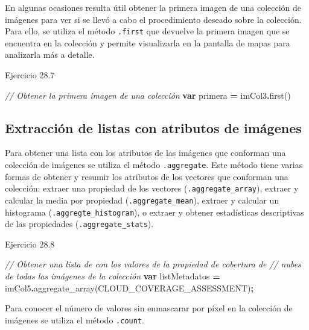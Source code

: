 \documentclass[
  12pt,
  letterpaper,
  twoside]{book}
\newenvironment{Shaded}{\begin{snugshade}}{\end{snugshade}}
\newcommand{\CommentTok}[1]{\textcolor[rgb]{0.56,0.35,0.01}{\textit{#1}}}
\newcommand{\FunctionTok}[1]{\textcolor[rgb]{0.00,0.00,0.00}{#1}}
\newcommand{\KeywordTok}[1]{\textcolor[rgb]{0.13,0.29,0.53}{\textbf{#1}}}
\newcommand{\NormalTok}[1]{#1}
\newcommand{\OperatorTok}[1]{\textcolor[rgb]{0.81,0.36,0.00}{\textbf{#1}}}
\newcommand{\StringTok}[1]{\textcolor[rgb]{0.31,0.60,0.02}{#1}}
\begin{document}
En algunas ocasiones resulta útil obtener la primera imagen de una colección de imágenes para ver si se llevó a cabo el procedimiento deseado sobre la colección. Para ello, se utiliza el método \texttt{.first} que devuelve la primera imagen que se encuentra en la colección y permite visualizarla en la pantalla de mapas para analizarla más a detalle.

Ejercicio 28.7

\begin{Shaded}
\begin{Highlighting}[]
\CommentTok{// Obtener la primera imagen de una colección}
\KeywordTok{var}\NormalTok{ primera }\OperatorTok{=}\NormalTok{ imCol3}\OperatorTok{.}\FunctionTok{first}\NormalTok{()}
\end{Highlighting}
\end{Shaded}

\hypertarget{extracciuxf3n-de-listas-con-atributos-de-imuxe1genes}{%
\subsection{Extracción de listas con atributos de imágenes}\label{extracciuxf3n-de-listas-con-atributos-de-imuxe1genes}}

Para obtener una lista con los atributos de las imágenes que conforman una colección de imágenes se utiliza el método \texttt{.aggregate}. Este método tiene varias formas de obtener y resumir los atributos de los vectores que conforman una colección: extraer una propiedad de los vectores (\texttt{.aggregate\_array}), extraer y calcular la media por propiedad (\texttt{.aggregate\_mean}), extraer y calcular un histograma (\texttt{.aggregte\_histogram}), o extraer y obtener estadísticas descriptivas de las propiedades (\texttt{.aggregate\_stats}).

Ejercicio 28.8

\begin{Shaded}
\begin{Highlighting}[]
\CommentTok{// Obtener una lista de con los valores de la propiedad de cobertura de }
\CommentTok{// nubes de todas las imágenes de la colección}
\KeywordTok{var}\NormalTok{ listMetadatos }\OperatorTok{=}\NormalTok{ imCol5}\OperatorTok{.}\FunctionTok{aggregate\_array}\NormalTok{(}\StringTok{\textquotesingle{}CLOUD\_COVERAGE\_ASSESSMENT\textquotesingle{}}\NormalTok{)}\OperatorTok{;}
\end{Highlighting}
\end{Shaded}

Para conocer el número de valores sin enmascarar por píxel en la colección de imágenes se utiliza el método \texttt{.count}.
\end{document}
